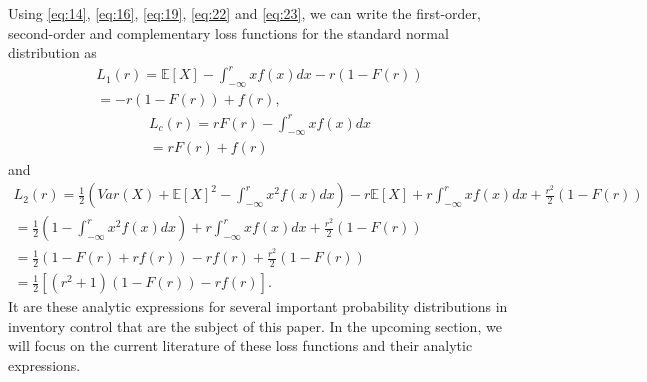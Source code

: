 \documentclass{article}
\begin{document}
\begin{flushleft}
    Using \ref{eq:14}, \ref{eq:16}, \ref{eq:19}, \ref{eq:22} and \ref{eq:23}, we can write the first-order, second-order and complementary loss functions for the standard normal distribution as
    \begin{equation}
        \begin{gathered}
            L_1(r) = \mathbb{E}[X]- \int_{-\infty}^r xf(x)dx - r(1-F(r)) \\
            = -r(1-F(r)) + f(r),
        \end{gathered}
    \end{equation}
    \begin{equation}
        \begin{gathered}
            L_c(r) = rF(r) - \int_{-\infty}^r xf(x)dx \\
            = rF(r) + f(r)
        \end{gathered}
    \end{equation}
    and
    \begin{equation}
        \begin{gathered}
            L_2(r) = \frac{1}{2}\left(Var(X) + \mathbb{E}[X]^2- \int_{-\infty}^r x^2f(x)dx\right) - r\mathbb{E}[X] + r\int_{-\infty}^r xf(x)dx + \frac{r^2}{2}(1-F(r)) \\
            = \frac{1}{2}\left(1 - \int_{-\infty}^r x^2f(x)dx\right) + r\int_{-\infty}^r xf(x)dx + \frac{r^2}{2}(1-F(r)) \\
            = \frac{1}{2}\left(1 - F(r) + rf(r)\right) - rf(r) + \frac{r^2}{2}(1-F(r)) \\
            = \frac{1}{2}\left[(r^2+1)(1-F(r))-rf(r)\right].
        \end{gathered}
    \end{equation}
    It are these analytic expressions for several important probability distributions in inventory control that are the subject of this paper.
    In the upcoming section, we will focus on the current literature of these loss functions and their analytic expressions.
\end{flushleft}
\end{document}
